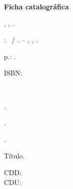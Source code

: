 \textbf{Ficha catalográfica}
\begin{center}
\begin{catalografica}%
	\myauthorlastname, \myauthorname, \myauthorborn.%

	\hspace{0.5cm} \mytitle: \mysubtitle~/ \myauthor. -- %
	\imprimirlocal, \imprimireditora, \imprimiryear.
	
	\hspace{0.5cm} \pageref{LastPage} p.: \imprimirpapersize.\\ %
	
	\hspace{0.5cm}
	\parbox[t]{\textwidth}{\imprimirtipotrabalho}%

	\hspace{0.5cm}
	\parbox[t]{\textwidth}{ISBN: \imprimirisbn}\\


	\hspace{0.5cm}
	\begin{inparaenum}[1.]
		\item \palavraschavea.
		\item \palavraschaveb.
		\item \palavraschavec.
	\end{inparaenum}
	\begin{inparaenum}[I.]
		\item Título.%
	\end{inparaenum}

    \begin{flushright}
    CDD: \imprimirCDD\\
    CDU: \imprimirCDU
    \end{flushright}
\end{catalografica}%
\end{center}
~\\


